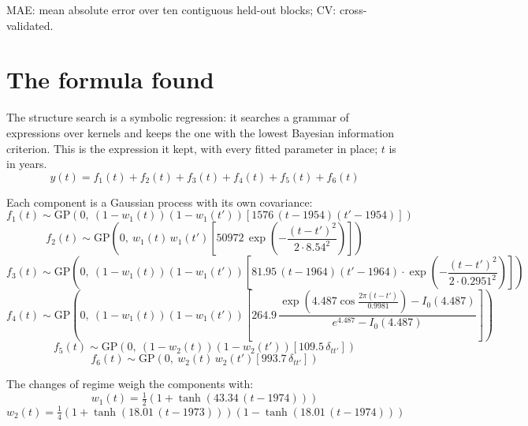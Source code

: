 \documentclass[11pt,a4paper]{article}
\begin{document}
MAE: mean absolute error over ten contiguous held-out blocks; CV: cross-validated.

\section*{The formula found}

The structure search is a symbolic regression: it searches a grammar of expressions over kernels and keeps the one with the lowest Bayesian information criterion. This is the expression it kept, with every fitted parameter in place; $t$ is in years.
\begin{dmath*}
y(t) = f_{1}(t) + f_{2}(t) + f_{3}(t) + f_{4}(t) + f_{5}(t) + f_{6}(t)
\end{dmath*}

Each component is a Gaussian process with its own covariance:
\begin{dmath*}
f_{1}(t) \sim \mathrm{GP}\!\left(0,\ (1 - w_{1}(t))(1 - w_{1}(t'))\left[1576\,(t - 1954)(t' - 1954)\right]\right)
\end{dmath*}
\begin{dmath*}
f_{2}(t) \sim \mathrm{GP}\!\left(0,\ w_{1}(t)\,w_{1}(t')\left[50972\,\exp\!\left(-\frac{(t - t')^2}{2 \cdot 8.54^2}\right)\right]\right)
\end{dmath*}
\begin{dmath*}
f_{3}(t) \sim \mathrm{GP}\!\left(0,\ (1 - w_{1}(t))(1 - w_{1}(t'))\left[81.95\,(t - 1964)(t' - 1964) \cdot \exp\!\left(-\frac{(t - t')^2}{2 \cdot 0.2951^2}\right)\right]\right)
\end{dmath*}
\begin{dmath*}
f_{4}(t) \sim \mathrm{GP}\!\left(0,\ (1 - w_{1}(t))(1 - w_{1}(t'))\left[264.9\,\frac{\exp\!\left(4.487\cos\frac{2\pi (t - t')}{0.9981}\right) - I_0(4.487)}{e^{4.487} - I_0(4.487)}\right]\right)
\end{dmath*}
\begin{dmath*}
f_{5}(t) \sim \mathrm{GP}\!\left(0,\ (1 - w_{2}(t))(1 - w_{2}(t'))\left[109.5\,\delta_{t t'}\right]\right)
\end{dmath*}
\begin{dmath*}
f_{6}(t) \sim \mathrm{GP}\!\left(0,\ w_{2}(t)\,w_{2}(t')\left[993.7\,\delta_{t t'}\right]\right)
\end{dmath*}

The changes of regime weigh the components with:
\begin{dmath*}
w_{1}(t) = \tfrac{1}{2}\left(1 + \tanh\left(43.34\,(t - 1974)\right)\right)
\end{dmath*}
\begin{dmath*}
w_{2}(t) = \tfrac{1}{4}\left(1 + \tanh\left(18.01\,(t - 1973)\right)\right)\left(1 - \tanh\left(18.01\,(t - 1974)\right)\right)
\end{dmath*}
\end{document}
